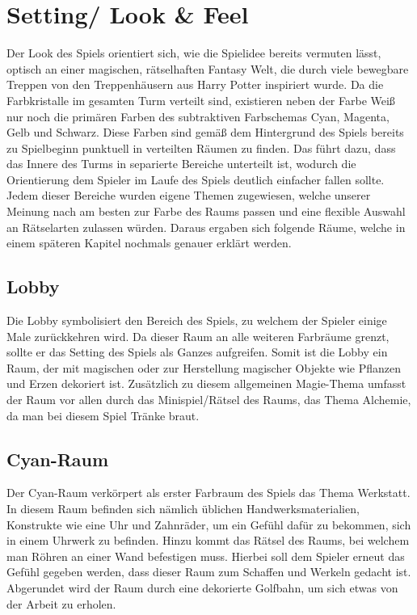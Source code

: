 \section{Setting/ Look \& Feel}
Der Look des Spiels orientiert sich, wie die Spielidee bereits vermuten lässt, optisch an einer magischen, rätselhaften Fantasy Welt, die durch viele bewegbare Treppen von den Treppenhäusern aus Harry Potter inspiriert wurde. Da die Farbkristalle im gesamten Turm verteilt sind, existieren neben der Farbe Weiß nur noch die primären Farben des subtraktiven Farbschemas Cyan, Magenta, Gelb und Schwarz. Diese Farben sind gemäß dem Hintergrund des Spiels bereits zu Spielbeginn punktuell in verteilten Räumen zu finden. Das führt dazu, dass das Innere des Turms in separierte Bereiche unterteilt ist, wodurch die Orientierung dem Spieler im Laufe des Spiels deutlich einfacher fallen sollte. Jedem dieser Bereiche wurden eigene Themen zugewiesen, welche unserer Meinung nach am besten zur Farbe des Raums passen und eine flexible Auswahl an Rätselarten zulassen würden. Daraus ergaben sich folgende Räume, welche in einem späteren Kapitel nochmals genauer erklärt werden.
\newpage
\noindent
\subsection{Lobby}
Die Lobby symbolisiert den Bereich des Spiels, zu welchem der Spieler einige Male zurückkehren wird. Da dieser Raum an alle weiteren Farbräume grenzt, sollte er das Setting des Spiels als Ganzes aufgreifen. Somit ist die Lobby ein Raum, der mit magischen oder zur Herstellung magischer Objekte wie Pflanzen und Erzen dekoriert ist. Zusätzlich zu diesem allgemeinen Magie-Thema umfasst der Raum vor allen durch das Minispiel/Rätsel des Raums, das Thema Alchemie, da man bei diesem Spiel Tränke braut.
\subsection{Cyan-Raum}
Der Cyan-Raum verkörpert als erster Farbraum des Spiels das Thema \dq Werkstatt\dq. In diesem Raum befinden sich nämlich üblichen Handwerksmaterialien, Konstrukte wie eine Uhr und Zahnräder, um ein Gefühl dafür zu bekommen, sich in einem Uhrwerk zu befinden. Hinzu kommt das Rätsel des Raums, bei welchem man Röhren an einer Wand befestigen muss. Hierbei soll dem Spieler erneut das Gefühl gegeben werden, dass dieser Raum zum Schaffen und Werkeln gedacht ist. Abgerundet wird der Raum durch eine dekorierte Golfbahn, um sich etwas von der Arbeit zu erholen.
